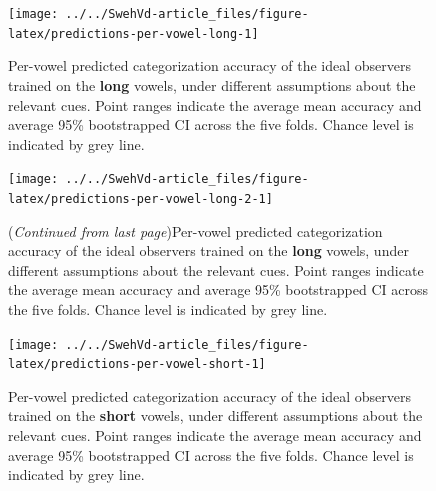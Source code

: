 \documentclass[utf8]{frontiers_suppmat} %
\begin{document}
\begin{landscape}

\begin{figure}

{\centering \texttt{[image: ../../SwehVd-article\_files/figure-latex/predictions-per-vowel-long-1]} 

}

\caption{Per-vowel predicted categorization accuracy of the ideal observers trained on the \textbf{long} vowels, under different assumptions about the relevant cues. Point ranges indicate the average mean accuracy and average 95\% bootstrapped CI across the five folds. Chance level is indicated by grey line.}\label{fig:predictions-per-vowel-long}
\end{figure}
\end{landscape}



\begin{landscape}

\begin{figure}

{\centering \texttt{[image: ../../SwehVd-article\_files/figure-latex/predictions-per-vowel-long-2-1]} 

}

\caption{(\emph{Continued from last page})Per-vowel predicted categorization accuracy of the ideal observers trained on the \textbf{long} vowels, under different assumptions about the relevant cues. Point ranges indicate the average mean accuracy and average 95\% bootstrapped CI across the five folds. Chance level is indicated by grey line.}\label{fig:predictions-per-vowel-long-2}
\end{figure}
\end{landscape}



\begin{figure}

{\centering \texttt{[image: ../../SwehVd-article\_files/figure-latex/predictions-per-vowel-short-1]} 

}

\caption{Per-vowel predicted categorization accuracy of the ideal observers trained on the \textbf{short} vowels, under different assumptions about the relevant cues. Point ranges indicate the average mean accuracy and average 95\% bootstrapped CI across the five folds. Chance level is indicated by grey line.}\label{fig:predictions-per-vowel-short}
\end{figure}
\end{document}
